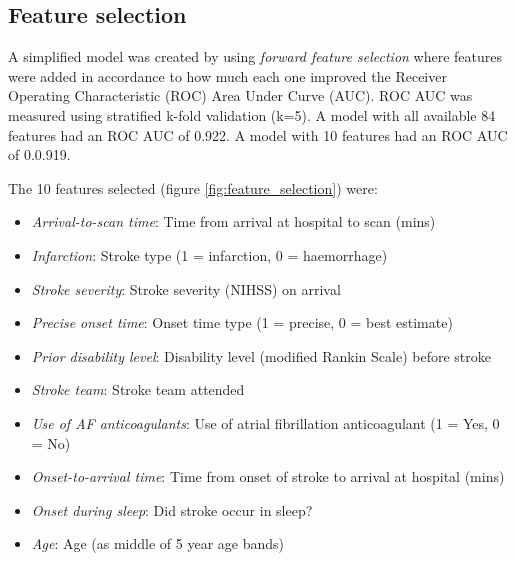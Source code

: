 \subsection{Feature selection}

A simplified model was created by using \emph{forward feature selection} where features were added in accordance to how much each one improved the Receiver Operating Characteristic (ROC) Area Under Curve (AUC). ROC AUC was measured using stratified k-fold validation (k=5). A model with all available 84 features had an ROC AUC of 0.922. A model with 10 features had an ROC AUC of 0.0.919.

The 10 features selected (figure \ref{fig:feature_selection}) were:

\begin{itemize}
    \item \emph{Arrival-to-scan time}: Time from arrival at hospital to scan (mins)
    \item \emph{Infarction}: Stroke type (1 = infarction, 0 = haemorrhage)
    \item \emph{Stroke severity}: Stroke severity (NIHSS) on arrival
    \item \emph{Precise onset time}: Onset time type (1 = precise, 0 = best estimate)
    \item \emph{Prior disability level}: Disability level (modified Rankin Scale) before stroke
    \item \emph{Stroke team}: Stroke team attended
    \item \emph{Use of AF anticoagulants}: Use of atrial fibrillation anticoagulant (1 = Yes, 0 = No)
    \item \emph{Onset-to-arrival time}: Time from onset of stroke to arrival at hospital (mins)
    \item \emph{Onset during sleep}: Did stroke occur in sleep?
    \item \emph{Age}: Age (as middle of 5 year age bands)
\end{itemize}

